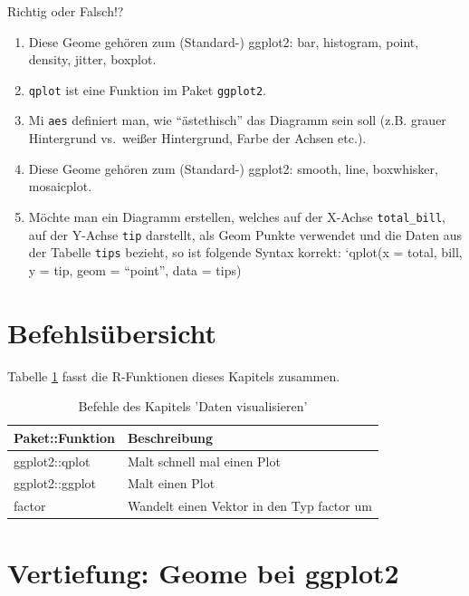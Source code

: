\documentclass[12pt,ngerman,]{book}
\theoremstyle{definition}
\theoremstyle{definition}
\theoremstyle{remark}
\let\BeginKnitrBlock\begin \let\EndKnitrBlock\end
\begin{document}
\BeginKnitrBlock{rmdexercises}
Richtig oder Falsch!?

\begin{enumerate}
\def\labelenumi{\arabic{enumi}.}
\item
  Diese Geome gehören zum (Standard-) ggplot2: bar, histogram, point,
  density, jitter, boxplot.
\item
  \texttt{qplot} ist eine Funktion im Paket \texttt{ggplot2}.
\item
  Mi \texttt{aes} definiert man, wie ``ästethisch'' das Diagramm sein
  soll (z.B. grauer Hintergrund vs.~weißer Hintergrund, Farbe der Achsen
  etc.).
\item
  Diese Geome gehören zum (Standard-) ggplot2: smooth, line, boxwhisker,
  mosaicplot.
\item
  Möchte man ein Diagramm erstellen, welches auf der X-Achse
  \texttt{total\_bill}, auf der Y-Achse \texttt{tip} darstellt, als Geom
  Punkte verwendet und die Daten aus der Tabelle \texttt{tips} bezieht,
  so ist folgende Syntax korrekt: `qplot(x = total, bill, y = tip, geom
  = ``point'', data = tips)
\end{enumerate}
\EndKnitrBlock{rmdexercises}

\section{Befehlsübersicht}\label{befehlsubersicht-4}

Tabelle \ref{tab:befehle-vis} fasst die R-Funktionen dieses Kapitels
zusammen.

\begin{table}

\caption{\label{tab:befehle-vis}Befehle des Kapitels 'Daten visualisieren'}
\centering
\begin{tabular}[t]{l|l}
\hline
Paket::Funktion & Beschreibung\\
\hline
ggplot2::qplot & Malt schnell mal einen Plot\\
\hline
ggplot2::ggplot & Malt einen Plot\\
\hline
factor & Wandelt einen Vektor in den Typ factor um\\
\hline
\end{tabular}
\end{table}

\section{Vertiefung: Geome bei ggplot2}\label{geome}
\end{document}
